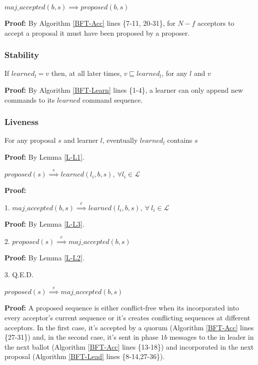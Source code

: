 \begin{lemma}
$maj\_accepted(b,s) \implies proposed(b,s)$ \label{N-L1} \par
\end{lemma}
\textbf{Proof:} By Algorithm \ref{BFT-Acc} lines \{7-11, 20-31\}, for $N-f$ acceptors to accept a proposal it must have been proposed by a proposer.

\subsubsection{Stability}
\begin{theorem}
If $learned_l = v$ then, at all later times, $v \sqsubseteq learned_l$, for any $l$ and $v$ \par \label{S-T1}
\end{theorem} 
\textbf{Proof:} By Algorithm \ref{BFT-Learn} lines \{1-4\}, a learner can only append new commands to its $learned$ command sequence.

\subsubsection{Liveness}
\begin{theorem}
For any proposal $s$ and learner $l$, eventually $learned_l$ contains $s$ \label{L-T1} \par
\end{theorem} 
\textbf{Proof:} By Lemma \ref{L-L1}.
\begin{lemma}
$proposed(s) \overset{e}{\implies} learned(l_i,b,s),\ \forall l_i \in \mathcal{L}$ \label{L-L1} \par
\end{lemma}
\textbf{Proof:} \par
1. $maj\_accepted(b,s) \overset{e}{\implies} learned(l_i,b,s),\ \forall\ l_i \in \mathcal{L}$ \par
\indent\indent\textbf{Proof:} By Lemma \ref{L-L3}.\par
2. $proposed(s) \overset{e}{\implies} maj\_accepted(b,s)$ \par
\indent\indent\textbf{Proof:} By Lemma \ref{L-L2}. \par
3. Q.E.D.

\begin{lemma}
$proposed(s) \overset{e}{\implies} maj\_accepted(b,s)$ \label{L-L2} \par
\end{lemma}
\textbf{Proof:} A proposed sequence is either conflict-free when its incorporated into every acceptor's current sequence or it's creates conflicting sequences at different acceptors. In the first case, it's accepted by a quorum (Algorithm \ref{BFT-Acc} lines \{27-31\}) and, in the second case, it's sent in phase $1b$ messages to the in leader in the next ballot (Algorithm \ref{BFT-Acc} lines \{13-18\}) and incorporated in the next proposal (Algorithm \ref{BFT-Lead} lines \{8-14,27-36\}). 


